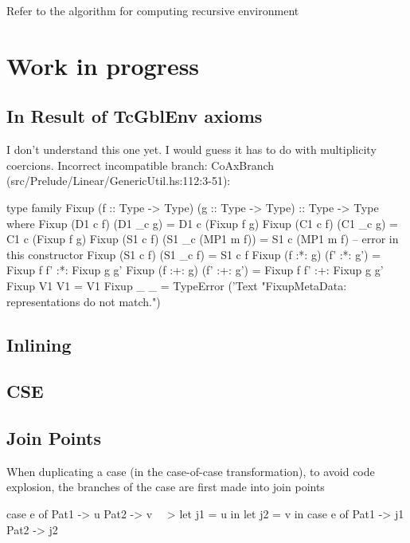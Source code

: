 \documentclass[a4paper, draft]{report}
\begin{document}
Refer to the algorithm for computing recursive environment


\section{Work in progress}

\subsection{In Result of TcGblEnv axioms}

I don't understand this one yet. I would guess it has to do with multiplicity
coercions. Incorrect incompatible branch: CoAxBranch (src/Prelude/Linear/GenericUtil.hs:112:3-51):
\begin{code}
type family Fixup (f :: Type -> Type) (g :: Type -> Type) :: Type -> Type where
  Fixup (D1 c f) (D1 _c g) = D1 c (Fixup f g)
  Fixup (C1 c f) (C1 _c g) = C1 c (Fixup f g)
  Fixup (S1 c f) (S1 _c (MP1 m f)) = S1 c (MP1 m f) -- error in this constructor
  Fixup (S1 c f) (S1 _c f) = S1 c f
  Fixup (f :*: g) (f' :*: g') = Fixup f f' :*: Fixup g g'
  Fixup (f :+: g) (f' :+: g') = Fixup f f' :+: Fixup g g'
  Fixup V1 V1 = V1
  Fixup _ _ = TypeError ('Text "FixupMetaData: representations do not match.")
\end{code}


\subsection{Inlining}

\subsection{CSE}

\subsection{Join Points}

When duplicating a case (in the case-of-case transformation), to avoid code
explosion, the branches of the case are first made into join points

\begin{code}
case e of
  Pat1 -> u
  Pat2 -> v
~~>
let j1 = u in
let j2 = v in
case e of
  Pat1 -> j1
  Pat2 -> j2
\end{code}
\end{document}
